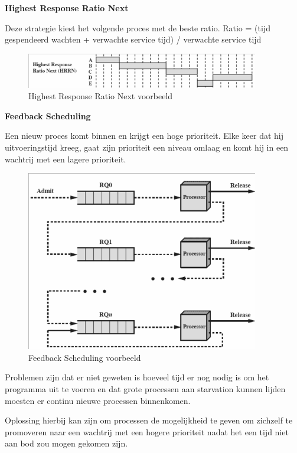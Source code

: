 \textbf{Highest Response Ratio Next}

Deze strategie kiest het volgende proces met de beste ratio.
Ratio = (tijd gespendeerd wachten + verwachte service tijd) / verwachte service tijd

\begin{figure}[htp]
    \centering
            \includegraphics[width=4in]{img/hrrn.png}
        \caption{Highest Response Ratio Next voorbeeld}
    \label{fig:Highest Response Ratio Next voorbeeld}
\end{figure}

\textbf{Feedback Scheduling}

Een nieuw proces komt binnen en krijgt een hoge prioriteit. Elke keer dat hij uitvoeringstijd kreeg, gaat zijn prioriteit een niveau omlaag en komt hij in een wachtrij met een lagere prioriteit.


\begin{figure}[htp]
    \centering
            \includegraphics[width=4in]{img/feedbackscheduling.png}
        \caption{Feedback Scheduling voorbeeld}
    \label{fig:Feedback Scheduling voorbeeld}
\end{figure}

Problemen zijn dat er niet geweten is hoeveel tijd er nog nodig is om het programma uit te voeren en dat grote processen aan starvation kunnen lijden moesten er continu nieuwe processen binnenkomen.

Oplossing hierbij kan zijn om processen de mogelijkheid te geven om zichzelf te promoveren naar een wachtrij met een hogere prioriteit nadat het een tijd niet aan bod zou mogen gekomen zijn.




